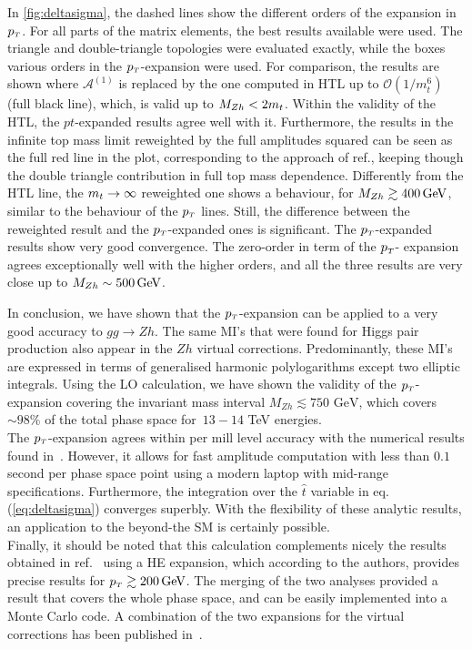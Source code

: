 In \autoref{fig:deltasigma}, the dashed lines show
the different orders of the expansion in $p_{\scriptscriptstyle T}$. 
For all parts of the matrix elements, the best results
available were used. The triangle and double-triangle
topologies were evaluated exactly, while the boxes various orders in the $p_{\scriptscriptstyle T}$-expansion were used.
For comparison, the results are shown where
$\mathcal{A}^{(1)}$ is replaced by the one computed in HTL up to
$\mathcal{O}(1/m_t^6)$ (full black line), which, is valid
up to $M_{Zh}< 2 m_t$.  Within the validity of the HTL, the $pt$-expanded
results agree well with it.
Furthermore, the results in the infinite top
mass limit reweighted by the full amplitudes squared can be seen as the full red line in the plot, corresponding to the approach of ref.\cite{Altenkamp:2012sx}, keeping though the double triangle
contribution in full top mass dependence. 
Differently from the HTL line, the $m_t \to \infty$ reweighted one
shows a behaviour, for  $M_{Zh} \gtrsim 400\,\textrm{GeV}$, similar to the behaviour of
the $p_{\scriptscriptstyle T}$ lines. Still,   the difference
between the reweighted result and the $p_{\scriptscriptstyle T}$-expanded ones is significant.
The $p_{\scriptscriptstyle T}$-expanded results show
very good convergence.  The zero-order in term of the $p_{\scriptscriptstyle T}$- expansion agrees
exceptionally well with the higher orders, and all the
three results are very close up to $M_{Zh} \sim 500\,\textrm{GeV}$.
\par In conclusion, we have shown that the $p_{\scriptscriptstyle T}$-expansion can be applied to a very good accuracy to $gg\to Zh$.  The same MI's that were found for Higgs pair production \cite{Bonciani:2018omm} also appear in the $Zh$ virtual corrections. Predominantly, these MI's are expressed in terms of generalised harmonic polylogarithms except two elliptic integrals. Using the LO calculation, we have shown the validity of the $p_{\scriptscriptstyle T}$-expansion covering the invariant mass interval  $M_{Zh}\lesssim 750\text{ GeV}$, which covers $\sim 98\%$ of the total phase space for~$13-14$ TeV energies.\\
The $p_{\scriptscriptstyle T}$-expansion agrees within per mill level accuracy with the numerical results found in~\cite{Chen:2020gae}. However, it allows for fast amplitude computation with less than $0.1$ second per phase space point using a modern laptop with mid-range specifications. Furthermore, the integration over the $\hat{t}$ variable
in eq.(\ref{eq:deltasigma}) converges superbly.  With the flexibility of these analytic
results, an application to the beyond-the SM is certainly
possible.\\ 
Finally, it should be noted that this calculation complements
nicely the results obtained in ref.~\cite{Davies:2020drs} using a HE
expansion, which according to the authors, provides precise results for
$p_{\scriptscriptstyle T} \gtrsim 200\,\textrm{GeV}$. The merging of the two analyses provided
a result that covers the whole phase space, and can be easily implemented into a
Monte Carlo code. A combination of the two expansions for the virtual corrections has been published in~\cite{Bellafronte:2022jmo}.